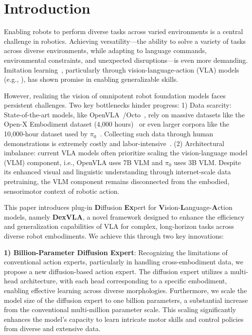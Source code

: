 \section{Introduction}
Enabling robots to perform diverse tasks across varied environments is a central challenge in robotics. Achieving versatility—the ability to solve a variety of tasks across diverse environments, while adapting to language commands, environmental constraints, and unexpected disruptions—is even more demanding. Imitation learning~\cite{lin2024learning,shi2023robocook, lin2024data, zhang2024learning, zeng2022robotic, qin2022dexmv}, particularly through vision-language-action (VLA) models (e.g., \cite{[pi0, rt-2, kim24openvla, hu2023look}), has shown promise in enabling generalizable skills. 


However, realizing the vision of omnipotent robot foundation models faces persistent challenges. Two key bottlenecks hinder progress: 1) Data scarcity: State-of-the-art models, like OpenVLA~\cite{kim24openvla}/Octo~\cite{octo}, rely on massive datasets like the Open-X Embodiment dataset (4,000 hours)~\cite{o2023open-x} or even larger corpora like the 10,000-hour dataset used by $\pi_{0}$~\cite{[pi0}. Collecting such data through human demonstrations is extremely costly and labor-intensive~\cite{fu2024humanplus, ha2024umi, wu2023tidybot, xiang2020sapien}. (2) Architectural imbalance: current VLA models often prioritize scaling the vision-language model (VLM) component, i.e., OpenVLA uses 7B VLM and $\pi_{0}$ uses 3B VLM. Despite its enhanced visual and linguistic understanding through internet-scale data pretraining, the VLM component remains disconnected from the embodied, sensorimotor context of robotic action.

This paper introduces plug-in \textbf{D}iffusion \textbf{Ex}pert for \textbf{V}ision-\textbf{L}anguage-\textbf{A}ction models, namely \textbf{DexVLA}, a novel framework designed to enhance the efficiency and generalization capabilities of VLA for complex, long-horizon tasks across diverse robot embodiments. We achieve this through two key innovations:


\textbf{1) Billion-Parameter Diffusion Expert}: Recognizing the limitations of conventional action experts, particularly in handling cross-embodiment data, we propose a new diffusion-based action expert. The diffusion expert utilizes a multi-head architecture, with each head corresponding to a specific embodiment, enabling effective learning across diverse morphologies.  Furthermore, we scale the model size of the diffusion expert to one billion parameters, a substantial increase from the conventional multi-million parameter scale. This scaling significantly enhances the model's capacity to learn intricate motor skills and control policies from diverse and extensive data.

